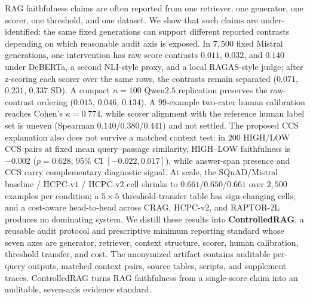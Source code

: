 RAG faithfulness claims are often reported from one retriever, one
generator, one scorer, one threshold, and one dataset. We show that
such claims are under-identified: the same fixed generations can support
different reported contrasts depending on which reasonable audit axis is
exposed. In $7{,}500$ fixed Mistral generations, one intervention has
raw score contrasts $0.011$, $0.032$, and $0.140$ under DeBERTa, a
second NLI-style proxy, and a local RAGAS-style judge; after z-scoring
each scorer over the same rows, the contrasts remain separated
($0.071$, $0.231$, $0.337$ SD). A compact $n{=}100$ Qwen$2.5$
replication preserves the raw-contrast ordering ($0.015$, $0.046$,
$0.134$). A $99$-example two-rater human calibration reaches
Cohen's $\kappa = 0.774$, while scorer alignment with the reference
human label set is uneven (Spearman $0.140 / 0.380 / 0.441$) and not
settled. The proposed CCS explanation also does not survive a matched
context test: in $200$ HIGH/LOW CCS pairs at fixed mean query--passage
similarity, HIGH--LOW faithfulness is $-0.002$ ($p = 0.628$, $95\%$ CI
$[-0.022, 0.017]$), while answer-span presence and CCS carry
complementary diagnostic signal. At scale, the SQuAD/Mistral
baseline / HCPC-v$1$ / HCPC-v$2$ cell shrinks to $0.661 / 0.650 /
0.661$ over $2{,}500$ examples per condition; a $5\times5$
threshold-transfer table has sign-changing cells; and a cost-aware
head-to-head across CRAG, HCPC-v$2$, and RAPTOR-$2$L produces no
dominating system. We distill these results into
\textbf{ControlledRAG}, a reusable audit protocol and prescriptive
minimum reporting standard whose seven axes are generator, retriever,
context structure, scorer, human calibration, threshold transfer, and
cost. The anonymized artifact contains auditable per-query outputs,
matched context pairs, source tables, scripts, and supplement traces.
ControlledRAG turns RAG faithfulness from a single-score claim into an
auditable, seven-axis evidence standard.
